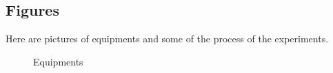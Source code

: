 \documentclass[12pt,a4paper]{article}
\begin{document}
\subsection{Figures}
Here are pictures of equipments and some of the process of the experiments.
\begin{figure}[h]
    \centering
    \caption{Equipments}
    \vspace{-0.5cm}
\end{figure}
\end{document}
